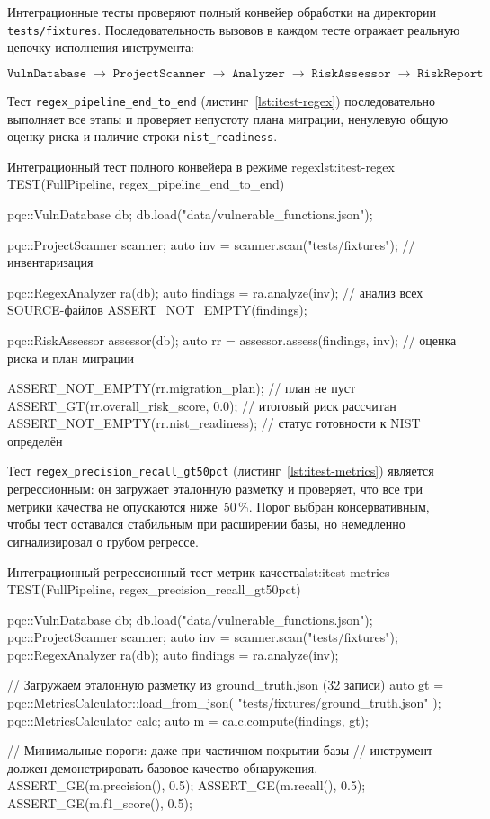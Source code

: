 Интеграционные тесты проверяют полный конвейер обработки
на директории \texttt{tests/\allowbreak fixtures}.
Последовательность вызовов в каждом тесте отражает реальную
цепочку исполнения инструмента:

\[
  \texttt{VulnDatabase}
  \;\to\; \texttt{ProjectScanner}
  \;\to\; \texttt{Analyzer}
  \;\to\; \texttt{RiskAssessor}
  \;\to\; \texttt{RiskReport}
\]

Тест \texttt{regex\_pipeline\_end\_to\_end}
(листинг~\ref{lst:itest-regex}) последовательно выполняет все
этапы и проверяет непустоту плана миграции, ненулевую общую
оценку риска и наличие строки \texttt{nist\_readiness}.

\begin{itmolisting}[C++]{Интеграционный тест полного конвейера в режиме regex}{lst:itest-regex}
TEST(FullPipeline, regex_pipeline_end_to_end) {
    pqc::VulnDatabase db;
    db.load("data/vulnerable_functions.json");

    pqc::ProjectScanner scanner;
    auto inv = scanner.scan("tests/fixtures"); // инвентаризация

    pqc::RegexAnalyzer ra(db);
    auto findings = ra.analyze(inv);           // анализ всех SOURCE-файлов
    ASSERT_NOT_EMPTY(findings);

    pqc::RiskAssessor assessor(db);
    auto rr = assessor.assess(findings, inv);  // оценка риска и план миграции

    ASSERT_NOT_EMPTY(rr.migration_plan);       // план не пуст
    ASSERT_GT(rr.overall_risk_score, 0.0);     // итоговый риск рассчитан
    ASSERT_NOT_EMPTY(rr.nist_readiness);       // статус готовности к NIST определён
}
\end{itmolisting}

Тест \texttt{regex\_precision\_recall\_gt50pct}
(листинг~\ref{lst:itest-metrics}) является регрессионным:
он загружает эталонную разметку и проверяет, что все три
метрики качества не опускаются ниже~50\,\%.
Порог выбран консервативным, чтобы тест оставался стабильным
при расширении базы, но немедленно сигнализировал о грубом
регрессе.

\begin{itmolisting}[C++]{Интеграционный регрессионный тест метрик качества}{lst:itest-metrics}
TEST(FullPipeline, regex_precision_recall_gt50pct) {
    pqc::VulnDatabase db;
    db.load("data/vulnerable_functions.json");
    pqc::ProjectScanner scanner;
    auto inv = scanner.scan("tests/fixtures");
    pqc::RegexAnalyzer ra(db);
    auto findings = ra.analyze(inv);

    // Загружаем эталонную разметку из ground_truth.json (32 записи)
    auto gt = pqc::MetricsCalculator::load_from_json(
        "tests/fixtures/ground_truth.json"
    );
    pqc::MetricsCalculator calc;
    auto m = calc.compute(findings, gt);

    // Минимальные пороги: даже при частичном покрытии базы
    // инструмент должен демонстрировать базовое качество обнаружения.
    ASSERT_GE(m.precision(), 0.5);
    ASSERT_GE(m.recall(),    0.5);
    ASSERT_GE(m.f1_score(),  0.5);
}
\end{itmolisting}

